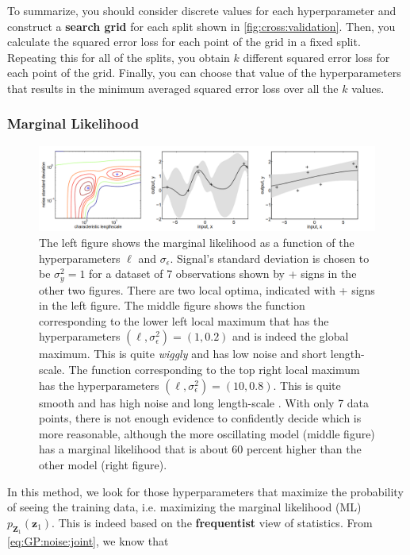 \documentclass[10pt]{article}
\theoremstyle{definition}
\begin{document}
To summarize, you should consider discrete values for each hyperparameter and construct a \textbf{search grid} for each split shown in \cref{fig:cross:validation}. Then, you calculate the squared error loss for each point of the grid in a fixed split. Repeating this for all of the splits, you obtain $k$ different squared error loss for each point of the grid. Finally, you can choose that value of the hyperparameters that results in the minimum averaged squared error loss over all the $k$ values.

\subsubsection{Marginal Likelihood}
\begin{figure}[t!]
\centering
\includegraphics[width=17cm]{figs/marginal-likelihood.png}
\caption{The left figure shows the marginal likelihood as a function of the hyperparameters $\ell$ and $\sigma_{\epsilon}$. Signal's standard
deviation is chosen to be $\sigma_y^2 = 1$ for a dataset of 7 observations shown by + signs in the other two figures. There are two local optima, indicated with + signs in the left figure. The middle figure shows the function corresponding to the lower left local maximum that has the hyperparameters $(\ell, \sigma_{\epsilon}^2)=(1, 0.2)$ and is indeed the global maximum. This is quite \textit{wiggly} and has low noise and short length-scale. The function corresponding to the top right local maximum has the hyperparameters $(\ell, \sigma_{\epsilon}^2)=(10, 0.8)$. This is quite smooth and has high noise and long length-scale \cite[Section 5.4.1]{Rasmussen2006}. With only 7 data points, there is not enough evidence to confidently decide which is more reasonable, although the more oscillating model (middle figure) has a marginal likelihood that is about 60 percent higher than the other model (right figure)\cite[Section 15.2.4]{Murphy2012}.}
\label{fig:marginal:likelihood}
\end{figure}
In this method, we look for those hyperparameters that maximize the probability of seeing the training data, i.e. maximizing the marginal likelihood (ML) $p_{\mathbf{Z}_1}(\mathbf{z}_1)$. This is indeed based on the \textbf{frequentist} view of statistics. From \cref{eq:GP:noise:joint}, we know that
\end{document}
